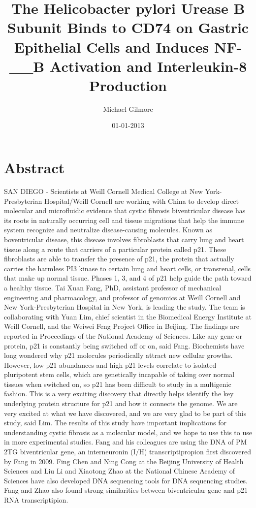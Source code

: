 \documentclass{article}%
\title{The Helicobacter pylori Urease B Subunit Binds to CD74 on Gastric Epithelial Cells and Induces NF{-}\_\_B Activation and Interleukin{-}8 Production}%
\author{Michael Gilmore}%
\affil{Institute of Medicine, Chung Shan Medical University, No. 110, Section 1, Jianguo N. Road, Taichung 402, Taiwan}%
\date{01{-}01{-}2013}%
\begin{document}
%
\normalsize%
\maketitle%
\section{Abstract}%
\label{sec:Abstract}%
SAN DIEGO {-} Scientists at Weill Cornell Medical College at New York{-}Presbyterian Hospital/Weill Cornell are working with China to develop direct molecular and microfluidic evidence that cystic fibrosis biventricular disease has its roots in naturally occurring cell and tissue migrations that help the immune system recognize and neutralize disease{-}causing molecules.\newline%
Known as boventricular disease, this disease involves fibroblasts that carry lung and heart tissue along a route that carriers of a particular protein called p21. These fibroblasts are able to transfer the presence of p21, the protein that actually carries the harmless PI3 kinase to certain lung and heart cells, or transrenal, cells that make up normal tissue. Phases 1, 3, and 4 of p21 help guide the path toward a healthy tissue.\newline%
Tai Xuan Fang, PhD, assistant professor of mechanical engineering and pharmacology, and professor of genomics at Weill Cornell and New York{-}Presbyterian Hospital in New York, is leading the study. The team is collaborating with Yuan Lim, chief scientist in the Biomedical Energy Institute at Weill Cornell, and the Weiwei Feng Project Office in Beijing.\newline%
The findings are reported in Proceedings of the National Academy of Sciences.\newline%
Like any gene or protein, p21 is constantly being switched off or on, said Fang. Biochemists have long wondered why p21 molecules periodically attract new cellular growths. However, low p21 abundances and high p21 levels correlate to isolated pluripotent stem cells, which are genetically incapable of taking over normal tissues when switched on, so p21 has been difficult to study in a multigenic fashion. This is a very exciting discovery that directly helps identify the key underlying protein structure for p21 and how it connects the genome.\newline%
We are very excited at what we have discovered, and we are very glad to be part of this study, said Lim. The results of this study have important implications for understanding cystic fibrosis as a molecular model, and we hope to use this to use in more experimental studies.\newline%
Fang and his colleagues are using the DNA of PM 2TG biventricular gene, an interneuronin (I/H) transcriptipropion first discovered by Fang in 2009. Fing Chen and Ning Cong at the Beijing University of Health Sciences and Liu Li and Xiaotong Zhao at the National Chinese Academy of Sciences have also developed DNA sequencing tools for DNA sequencing studies. Fang and Zhao also found strong similarities between biventricular gene and p21 RNA transcriptipion.
\end{document}
